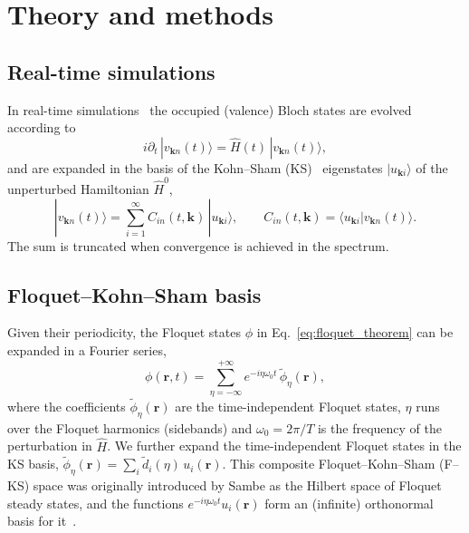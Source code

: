 \documentclass{iopjournal}
\begin{document}
\section{Theory and methods}

\subsection{Real-time simulations}
\label{sec:rt}

In real-time simulations~\cite{Attaccalite2013} the occupied (valence) Bloch
states are evolved according to
\begin{equation}
  i\partial_t\,|v_{\mathbf k n}(t)\rangle = \hat H(t)\,|v_{\mathbf k n}(t)\rangle ,
  \label{eq:rt_eom}
\end{equation}
and are expanded in the basis of the Kohn--Sham (KS)~\cite{KohnSham1965} eigenstates
$|u_{\mathbf k i}\rangle$ of the unperturbed Hamiltonian $\hat H^0$,
\begin{equation}
  |v_{\mathbf k n}(t)\rangle = \sum_{i=1}^{\infty} C_{in}(t,\mathbf k)\,|u_{\mathbf k i}\rangle,
  \qquad
  C_{in}(t,\mathbf k) = \langle u_{\mathbf k i}|v_{\mathbf k n}(t)\rangle .
  \label{eq:ks_expansion}
\end{equation}
The sum is truncated when convergence is achieved in the spectrum.

\subsection{Floquet--Kohn--Sham basis}
\label{sec:fks}

Given their periodicity, the Floquet states $\phi$ in Eq.~\ref{eq:floquet_theorem} can be
expanded in a Fourier series,
\begin{equation}
  \phi(\mathbf r,t) = \sum_{\eta=-\infty}^{+\infty} e^{-i\eta\omega_0 t}\,\tilde\phi_\eta(\mathbf r),
  \label{eq:fourier}
\end{equation}
where the coefficients $\tilde\phi_\eta(\mathbf r)$ are the time-independent Floquet states,
$\eta$ runs over the Floquet harmonics (sidebands) and $\omega_0=2\pi/T$ is the frequency of
the perturbation in $\hat H$. We further expand the time-independent Floquet states in the
KS basis, $\tilde\phi_\eta(\mathbf r)=\sum_i \tilde d_i(\eta)\,u_i(\mathbf r)$. This composite
Floquet--Kohn--Sham (F--KS) space was originally introduced by Sambe as the Hilbert space of
Floquet steady states, and the functions $e^{-i\eta\omega_0 t}u_i(\mathbf r)$ form an (infinite)
orthonormal basis for it~\cite{Sambe1973}.
\end{document}

